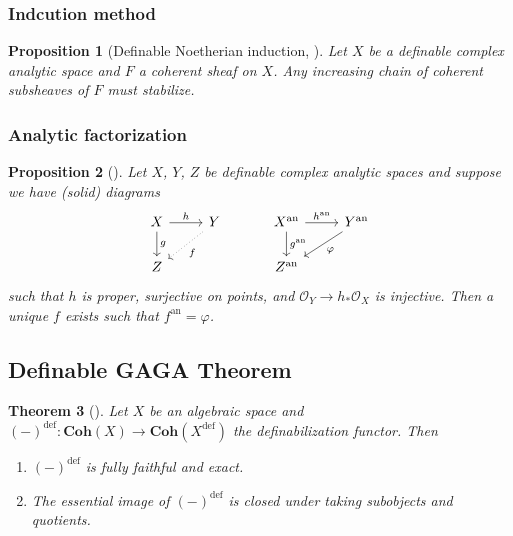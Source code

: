 \documentclass{amsart}
\newtheorem{theorem}{Theorem}[section]
\newtheorem{proposition}[theorem]{Proposition}
\theoremstyle{definition}
\numberwithin{equation}{section}
\newcommand{\definable}{\mathrm{def}}
\newcommand{\analytic}{\mathrm{an}}
\begin{document}
\subsubsection{Indcution method}
\begin{proposition}[Definable Noetherian induction, {\cite[Proposition 2.46]{zbMATH07662555}}]
    Let $X$ be a definable complex analytic space and $F$ a coherent sheaf on $X$. 
    Any increasing chain of coherent subsheaves of $F$ must stabilize.
\end{proposition}

\subsubsection{Analytic factorization}
\begin{proposition}[{\cite[Proposition 2.55]{zbMATH07662555}}]
    Let $X$, $Y$, $Z$ be definable complex analytic spaces and
    suppose we have (solid) diagrams
    \[
    \begin{tikzcd}
        X \ar[r,"h"] \ar[d,"g"] & Y\ar[dl,"f",dotted] \\ Z 
    \end{tikzcd}
    \hspace*{30pt}
    \begin{tikzcd}
        X^{\analytic} \ar[r,"h^{\analytic}"] \ar[d,"g^{\analytic}"] & Y^{\analytic}\ar[dl,"\varphi"] \\ Z^{\analytic} 
    \end{tikzcd}
    \]
    such that $h$ is proper, surjective on points,
    and $\mathcal{O}_Y \to h_*\mathcal{O}_X$ is injective.
    Then a unique $f$ exists such that $f^{\analytic} = \varphi$.
\end{proposition}

\subsection{Definable GAGA Theorem}

\begin{theorem}[{\cite[Theorem 3.1]{zbMATH07662555}}]
    \label{def GAGA}
    Let $X$ be an algebraic space and 
    $(-)^{\definable} : \mathbf{Coh}(X) \to \mathbf{Coh}(X^{\definable})$ the definabilization functor.
    Then 
    \begin{enumerate}[label = {(\arabic*)}]
        \item $(-)^{\definable}$ is fully faithful and exact.
        \item The essential image of $(-)^{\definable}$ is closed under taking subobjects and quotients.
    \end{enumerate}
\end{theorem}
\end{document}
